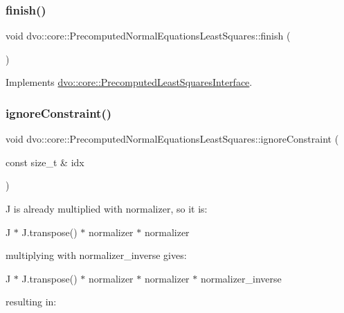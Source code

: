 \subsubsection{\texorpdfstring{finish()}{finish()}}
{\footnotesize\ttfamily void dvo\+::core\+::\+Precomputed\+Normal\+Equations\+Least\+Squares\+::finish (\begin{DoxyParamCaption}{ }\end{DoxyParamCaption})\hspace{0.3cm}{\ttfamily [virtual]}}



Implements \mbox{\hyperlink{classdvo_1_1core_1_1_precomputed_least_squares_interface_a6b811d85e3fe6a8a054b639171f9b353}{dvo\+::core\+::\+Precomputed\+Least\+Squares\+Interface}}.

\mbox{\label{classdvo_1_1core_1_1_precomputed_normal_equations_least_squares_a3abc1c62317598bbbacf3b021d39bff3}} 
\subsubsection{\texorpdfstring{ignore\+Constraint()}{ignoreConstraint()}}
{\footnotesize\ttfamily void dvo\+::core\+::\+Precomputed\+Normal\+Equations\+Least\+Squares\+::ignore\+Constraint (\begin{DoxyParamCaption}\item[{const size\+\_\+t \&}]{idx }\end{DoxyParamCaption})\hspace{0.3cm}{\ttfamily [virtual]}}

J is already multiplied with normalizer, so it is\+:

J\textquotesingle{} $\ast$ J\textquotesingle{}.transpose() $\ast$ normalizer $\ast$ normalizer

multiplying with normalizer\+\_\+inverse gives\+:

J\textquotesingle{} $\ast$ J\textquotesingle{}.transpose() $\ast$ normalizer $\ast$ normalizer $\ast$ normalizer\+\_\+inverse

resulting in\+:

